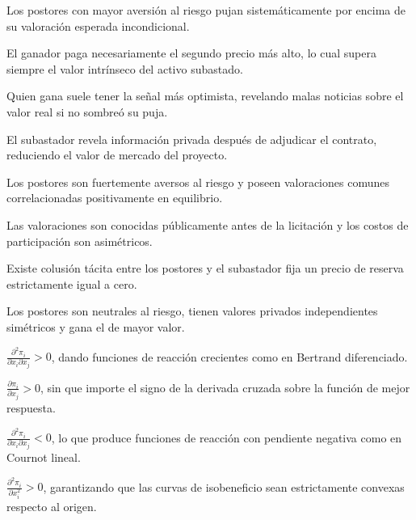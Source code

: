 \begin{opts}
    \item Los postores con mayor aversión al riesgo pujan sistemáticamente por encima de su valoración esperada incondicional.
    \item El ganador paga necesariamente el segundo precio más alto, lo cual supera siempre el valor intrínseco del activo subastado.
    \item Quien gana suele tener la señal más optimista, revelando malas noticias sobre el valor real si no sombreó su puja.
    \item El subastador revela información privada después de adjudicar el contrato, reduciendo el valor de mercado del proyecto.
\end{opts}

\begin{opts}
    \item Los postores son fuertemente aversos al riesgo y poseen valoraciones comunes correlacionadas positivamente en equilibrio.
    \item Las valoraciones son conocidas públicamente antes de la licitación y los costos de participación son asimétricos.
    \item Existe colusión tácita entre los postores y el subastador fija un precio de reserva estrictamente igual a cero.
    \item Los postores son neutrales al riesgo, tienen valores privados independientes simétricos y gana el de mayor valor.
\end{opts}

\begin{opts}
    \item $\frac{\partial^2 \pi_i}{\partial x_i \partial x_j} > 0$, dando funciones de reacción crecientes como en Bertrand diferenciado.
    \item $\frac{\partial \pi_i}{\partial x_j} > 0$, sin que importe el signo de la derivada cruzada sobre la función de mejor respuesta.
    \item $\frac{\partial^2 \pi_i}{\partial x_i \partial x_j} < 0$, lo que produce funciones de reacción con pendiente negativa como en Cournot lineal.
    \item $\frac{\partial^2 \pi_i}{\partial x_i^2} > 0$, garantizando que las curvas de isobeneficio sean estrictamente convexas respecto al origen.
\end{opts}


